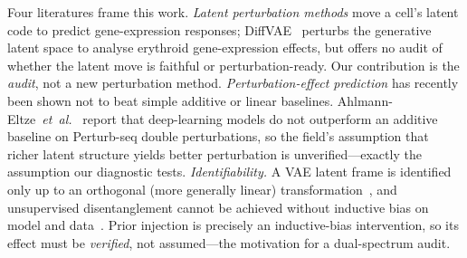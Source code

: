 \documentclass[11pt,a4paper]{article}
\begin{document}
Four literatures frame this work. \emph{Latent perturbation methods} move a cell's latent code to predict gene-expression responses; DiffVAE~\cite{diffvae} perturbs the generative latent space to analyse erythroid gene-expression effects, but offers no audit of whether the latent move is faithful or perturbation-ready. Our contribution is the \emph{audit}, not a new perturbation method. \emph{Perturbation-effect prediction} has recently been shown not to beat simple additive or linear baselines. Ahlmann-Eltze~\emph{et~al.}~\cite{ahlmann2025} report that deep-learning models do not outperform an additive baseline on Perturb-seq double perturbations, so the field's assumption that richer latent structure yields better perturbation is unverified---exactly the assumption our diagnostic tests. \emph{Identifiability.} A VAE latent frame is identified only up to an orthogonal (more generally linear) transformation~\cite{khemakhem2020}, and unsupervised disentanglement cannot be achieved without inductive bias on model and data~\cite{locatello2019}. Prior injection is precisely an inductive-bias intervention, so its effect must be \emph{verified}, not assumed---the motivation for a dual-spectrum audit.
\end{document}
